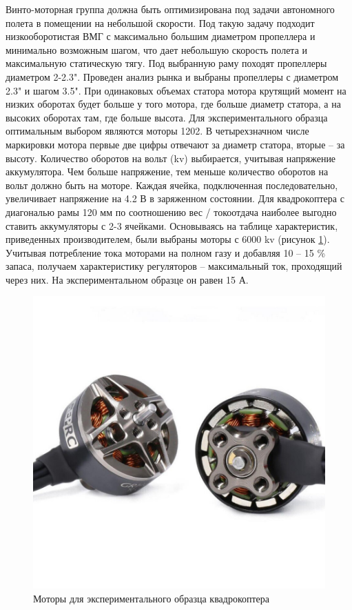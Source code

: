 Винто-моторная группа должна быть оптимизирована под задачи автономного полета в помещении на небольшой скорости. Под такую задачу подходит низкооборотистая ВМГ с максимально большим диаметром пропеллера и минимально возможным шагом, что дает небольшую скорость полета и максимальную статическую тягу. Под выбранную раму походят пропеллеры диаметром 2-2.3". Проведен анализ рынка и выбраны пропеллеры с диаметром 2.3" и шагом 3.5". При одинаковых объемах статора мотора крутящий момент на низких оборотах будет больше у того мотора, где больше диаметр статора, а на высоких оборотах там, где больше высота. Для экспериментального образца оптимальным выбором являются моторы 1202. В четырехзначном числе маркировки мотора первые две цифры отвечают за диаметр статора, вторые -- за высоту. Количество оборотов на вольт (kv) выбирается, учитывая напряжение аккумулятора. Чем больше напряжение, тем меньше количество оборотов на вольт должно быть на моторе. Каждая ячейка, подключенная последовательно, увеличивает напряжение на 4.2 В в заряженном состоянии. Для квадрокоптера с диагональю рамы 120 мм по соотношению вес / токоотдача наиболее выгодно ставить аккумуляторы с 2-3 ячейками. Основываясь на таблице характеристик, приведенных производителем, были выбраны моторы с 6000 kv (рисунок \ref{fig:motor}).
Учитывая потребление тока моторами на полном газу и добавляя 10 -- 15 \% запаса, получаем характеристику регуляторов -- максимальный ток, проходящий через них. На экспериментальном образце он равен 15 А.
\begin{figure}[H]
	\centering
	\includegraphics[width=0.5\linewidth]{../RW/pics/motor}
	\caption{Моторы для экспериментального образца квадрокоптера
	}
	\label{fig:motor} %
\end{figure}

